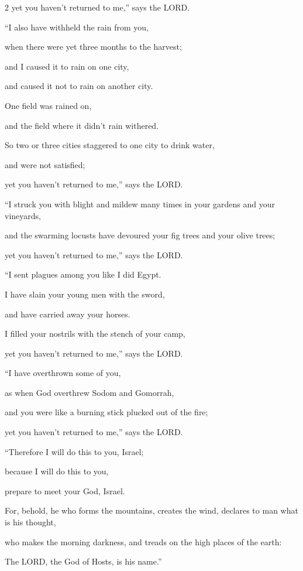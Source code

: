 \begin{multicols}{2}
	yet you haven’t returned to me,” says the LORD.
	
	\myverse{}“I also have withheld the rain from you,
	
	when there were yet three months to the harvest;
	
	and I caused it to rain on one city,
	
	and caused it not to rain on another city.
	
	One field was rained on,
	
	and the field where it didn’t rain withered.
	
	\myverse{}So two or three cities staggered to one city to drink water,
	
	and were not satisfied;
	
	yet you haven’t returned to me,” says the LORD.
	
	\myverse{}“I struck you with blight and mildew many times in your gardens
	and your vineyards,
	
	and the swarming locusts have devoured your fig trees and your olive trees;
	
	yet you haven’t returned to me,” says the LORD.
	
	\myverse{}“I sent plagues among you like I did Egypt.
	
	I have slain your young men with the sword,
	
	and have carried away your horses.
	
	I filled your nostrils with the stench of your camp,
	
	yet you haven’t returned to me,” says the LORD.
	
	\myverse{}“I have overthrown some of you,
	
	as when God overthrew Sodom and Gomorrah,
	
	and you were like a burning stick plucked out of the fire;
	
	yet you haven’t returned to me,” says the LORD.
	
	\myverse{}“Therefore I will do this to you, Israel;
	
	because I will do this to you,
	
	prepare to meet your God, Israel.
	
	\myverse{}For, behold, he who forms the mountains, creates the wind, declares
	to man what is his thought,
	
	who makes the morning darkness, and treads on the high places of the earth:
	
	The LORD, the God of Hosts, is his name.”
	

\end{multicols}
